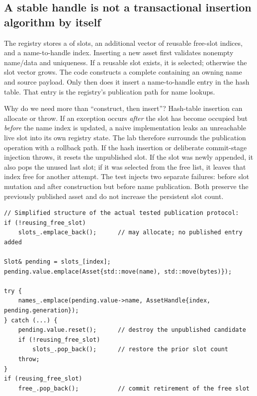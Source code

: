\subsection{A stable handle is not a transactional insertion algorithm by itself}\label{01-foundations-i-ch006-a-stable-handle-is-not-a-transactional-insertion-algorithm-by-itself}

\hypertarget{01-foundations-i-ch006-a-stable-handle-is-not-a-transactional-insertion-algorithm-by-itself}{}

The registry stores a  of slots, an additional vector of reusable free-slot indices, and a name-to-handle index. Inserting a new asset first validates nonempty name/data and uniqueness. If a reusable slot exists, it is selected; otherwise the slot vector grows. The code constructs a complete  containing an owning  name and  source payload. Only then does it insert a name-to-handle entry in the hash table. That entry is the registry's publication path for name lookups.

Why do we need more than ``construct, then insert''? Hash-table insertion can allocate or throw. If an exception occurs \emph{after} the slot has become occupied but \emph{before} the name index is updated, a naive implementation leaks an unreachable live slot into its own registry state. The lab therefore surrounds the publication operation with a rollback path. If the hash insertion or deliberate commit-stage injection throws, it resets the unpublished slot. If the slot was newly appended, it also pops the unused last slot; if it was selected from the free list, it leaves that index free for another attempt. The test injects two separate failures: before slot mutation and after construction but before name publication. Both preserve the previously published asset and do not increase the persistent slot count.

\begin{verbatim}
// Simplified structure of the actual tested publication protocol:
if (!reusing_free_slot)
    slots_.emplace_back();      // may allocate; no published entry added

Slot& pending = slots_[index];
pending.value.emplace(Asset{std::move(name), std::move(bytes)});

try {
    names_.emplace(pending.value->name, AssetHandle{index, pending.generation});
} catch (...) {
    pending.value.reset();      // destroy the unpublished candidate
    if (!reusing_free_slot)
        slots_.pop_back();      // restore the prior slot count
    throw;
}
if (reusing_free_slot)
    free_.pop_back();           // commit retirement of the free slot
\end{verbatim}

